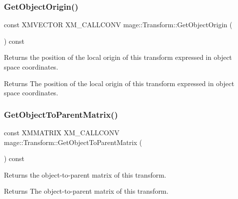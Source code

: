 \subsubsection{\texorpdfstring{Get\+Object\+Origin()}{GetObjectOrigin()}}
{\footnotesize\ttfamily const X\+M\+V\+E\+C\+T\+OR X\+M\+\_\+\+C\+A\+L\+L\+C\+O\+NV mage\+::\+Transform\+::\+Get\+Object\+Origin (\begin{DoxyParamCaption}{ }\end{DoxyParamCaption}) const\hspace{0.3cm}{\ttfamily [noexcept]}}

Returns the position of the local origin of this transform expressed in object space coordinates.

\begin{DoxyReturn}{Returns}
The position of the local origin of this transform expressed in object space coordinates. 
\end{DoxyReturn}
\mbox{\label{classmage_1_1_transform_a9026a83f1441c9efefc7a67e005a833d}} 
\subsubsection{\texorpdfstring{Get\+Object\+To\+Parent\+Matrix()}{GetObjectToParentMatrix()}}
{\footnotesize\ttfamily const X\+M\+M\+A\+T\+R\+IX X\+M\+\_\+\+C\+A\+L\+L\+C\+O\+NV mage\+::\+Transform\+::\+Get\+Object\+To\+Parent\+Matrix (\begin{DoxyParamCaption}{ }\end{DoxyParamCaption}) const\hspace{0.3cm}{\ttfamily [noexcept]}}

Returns the object-\/to-\/parent matrix of this transform.

\begin{DoxyReturn}{Returns}
The object-\/to-\/parent matrix of this transform. 
\end{DoxyReturn}
\mbox{\label{classmage_1_1_transform_a2f86a149ce70931f0019ebbe740ba30f}} 
